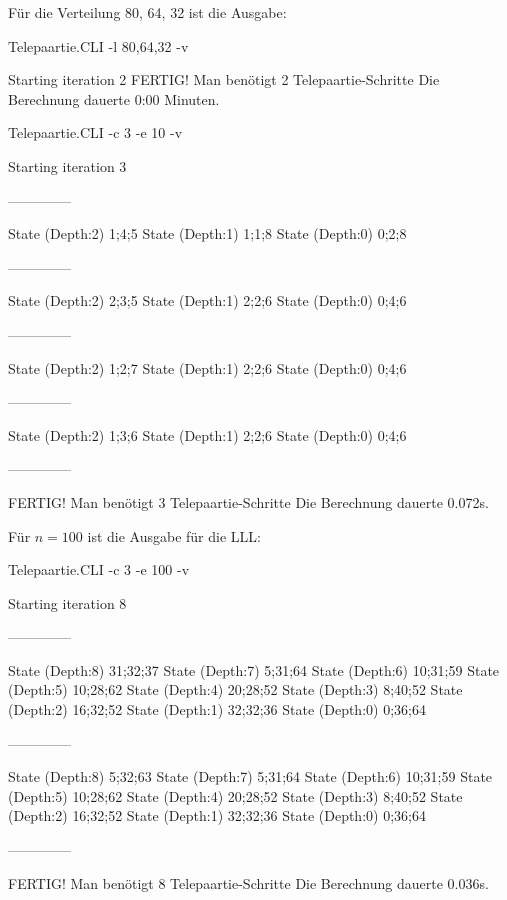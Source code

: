 \documentclass[a4paper,10pt,ngerman]{scrartcl}
\begin{document}
Für die Verteilung 80, 64, 32 ist die Ausgabe:
\begin{lstcs}
Telepaartie.CLI -l 80,64,32 -v

Starting iteration 2
FERTIG!
Man benötigt 2 Telepaartie-Schritte
Die Berechnung dauerte 0:00 Minuten.
\end{lstcs}

\begin{lstcs}
Telepaartie.CLI -c 3 -e 10 -v

Starting iteration 3

--------------

State (Depth:2) {1;4;5}
State (Depth:1) {1;1;8}
State (Depth:0) {0;2;8}

--------------

State (Depth:2) {2;3;5}
State (Depth:1) {2;2;6}
State (Depth:0) {0;4;6}

--------------

State (Depth:2) {1;2;7}
State (Depth:1) {2;2;6}
State (Depth:0) {0;4;6}

--------------

State (Depth:2) {1;3;6}
State (Depth:1) {2;2;6}
State (Depth:0) {0;4;6}

--------------


FERTIG!
Man benötigt 3 Telepaartie-Schritte
Die Berechnung dauerte 0.072s.
\end{lstcs}

Für \(n = 100\) ist die Ausgabe für die LLL:
\begin{lstcs}
Telepaartie.CLI -c 3 -e 100 -v

Starting iteration 8

--------------

State (Depth:8) {31;32;37}
State (Depth:7) {5;31;64}
State (Depth:6) {10;31;59}
State (Depth:5) {10;28;62}
State (Depth:4) {20;28;52}
State (Depth:3) {8;40;52}
State (Depth:2) {16;32;52}
State (Depth:1) {32;32;36}
State (Depth:0) {0;36;64}

--------------

State (Depth:8) {5;32;63}
State (Depth:7) {5;31;64}
State (Depth:6) {10;31;59}
State (Depth:5) {10;28;62}
State (Depth:4) {20;28;52}
State (Depth:3) {8;40;52}
State (Depth:2) {16;32;52}
State (Depth:1) {32;32;36}
State (Depth:0) {0;36;64}

--------------


FERTIG!
Man benötigt 8 Telepaartie-Schritte
Die Berechnung dauerte 0.036s.
\end{lstcs}
\end{document}
